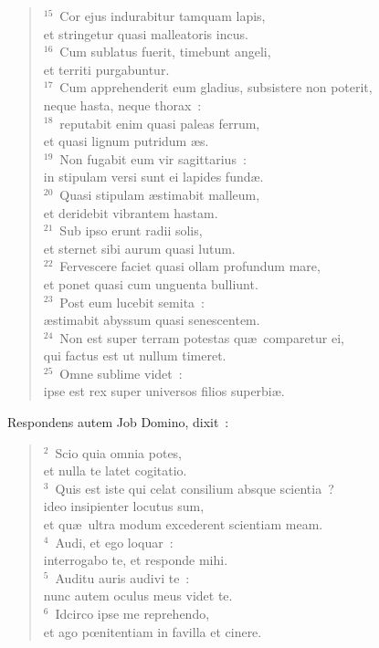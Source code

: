 \begin{flushleft}
\begin{verse}
${}^{15}$~Cor ejus indurabitur tamquam lapis,\\ et stringetur quasi malleatoris incus.\\
${}^{16}$~Cum sublatus fuerit, timebunt angeli,\\ et territi purgabuntur.\\
${}^{17}$~Cum apprehenderit eum gladius, subsistere non poterit,\\ neque hasta, neque thorax~:\\
${}^{18}$~reputabit enim quasi paleas ferrum,\\ et quasi lignum putridum \ae s.\\
${}^{19}$~Non fugabit eum vir sagittarius~:\\ in stipulam versi sunt ei lapides fund\ae .\\
${}^{20}$~Quasi stipulam \ae stimabit malleum,\\ et deridebit vibrantem hastam.\\
${}^{21}$~Sub ipso erunt radii solis,\\ et sternet sibi aurum quasi lutum.\\
${}^{22}$~Fervescere faciet quasi ollam profundum mare,\\ et ponet quasi cum unguenta bulliunt.\\
${}^{23}$~Post eum lucebit semita~:\\ \ae stimabit abyssum quasi senescentem.\\
${}^{24}$~Non est super terram potestas qu\ae\ comparetur ei,\\ qui factus est ut nullum timeret.\\
${}^{25}$~Omne sublime videt~:\\ ipse est rex super universos filios superbi\ae .\end{verse}\end{flushleft}



\lettrine[lines=3,image=true,loversize=0.05,lraise=-0.03]{R}{}espondens autem Job Domino, dixit~:
\begin{flushleft}\begin{verse}\vspace{6pt}${}^{2}$~Scio quia omnia potes,\\ et nulla te latet cogitatio.\\
${}^{3}$~Quis est iste qui celat consilium absque scientia~?\\ ideo insipienter locutus sum,\\ et qu\ae\ ultra modum excederent scientiam meam.\\
${}^{4}$~Audi, et ego loquar~:\\ interrogabo te, et responde mihi.\\
${}^{5}$~Auditu auris audivi te~:\\ nunc autem oculus meus videt te.\\
${}^{6}$~Idcirco ipse me reprehendo,\\ et ago pœnitentiam in favilla et cinere.\end{verse}\end{flushleft}


